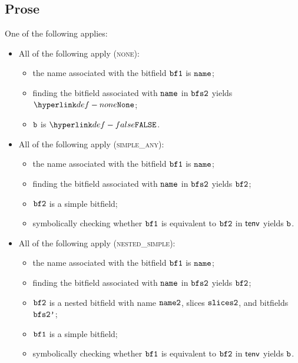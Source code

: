\subsection{Prose}
One of the following applies:
\begin{itemize}
  \item All of the following apply (\textsc{none}):
  \begin{itemize}
    \item the name associated with the bitfield $\texttt{bf1}$ is $\texttt{name}$;
    \item finding the bitfield associated with $\texttt{name}$ in $\texttt{bfs2}$ yields $\None$;
    \item $\texttt{b}$ is $\False$.
  \end{itemize}

  \item All of the following apply (\textsc{simple\_any}):
  \begin{itemize}
    \item the name associated with the bitfield $\texttt{bf1}$ is $\texttt{name}$;
    \item finding the bitfield associated with $\texttt{name}$ in $\texttt{bfs2}$ yields $\texttt{bf2}$;
    \item $\texttt{bf2}$ is a simple bitfield;
    \item symbolically checking whether $\texttt{bf1}$ is equivalent to $\texttt{bf2}$ in $\textsf{tenv}$ yields $\texttt{b}$.
  \end{itemize}

  \item All of the following apply (\textsc{nested\_simple}):
  \begin{itemize}
    \item the name associated with the bitfield $\texttt{bf1}$ is $\texttt{name}$;
    \item finding the bitfield associated with $\texttt{name}$ in $\texttt{bfs2}$ yields $\texttt{bf2}$;
    \item $\texttt{bf2}$ is a nested bitfield with name $\texttt{name2}$, slices $\texttt{slices2}$, and bitfields $\texttt{bfs2'}$;
    \item $\texttt{bf1}$ is a simple bitfield;
    \item symbolically checking whether $\texttt{bf1}$ is equivalent to $\texttt{bf2}$ in $\textsf{tenv}$ yields $\texttt{b}$.
  \end{itemize}


\end{itemize}
